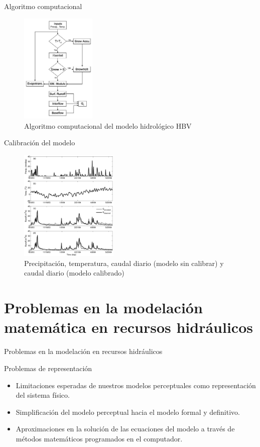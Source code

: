 \documentclass[
10pt,
aspectratio=169,
]{beamer}
\begin{document}
\begin{frame}{Algoritmo computacional}
\vspace{-0.2cm}
\begin{figure}
\centering
\includegraphics[width=0.32\textwidth]{f8mod.png}
\caption{Algoritmo computacional del modelo hidrológico HBV}
\end{figure}
\end{frame}

\begin{frame}{Calibración del modelo}
\vspace{-0.2cm}
\begin{figure}
\centering
\includegraphics[width=0.42\textwidth]{f9mod.png}
\caption{Precipitaci\'on, temperatura, caudal diario (modelo sin calibrar) y caudal diario (modelo calibrado)}
\end{figure}
\end{frame}


\section{Problemas en la modelaci\'on matemática en recursos hidráulicos}
\begin{frame}{Problemas en la modelaci\'on en recursos hidr\'aulicos}
\begin{block}{Problemas de representaci\'on}
\begin{itemize}
\item Limitaciones esperadas de nuestros modelos perceptuales como representación del sistema físico.
\item Simplificación del modelo perceptual hacia el modelo formal y definitivo.
\item Aproximaciones en la solución de las ecuaciones del modelo a través de métodos matemáticos programados en el computador.
\end{itemize}
\end{block}
\end{frame}
\end{document}
